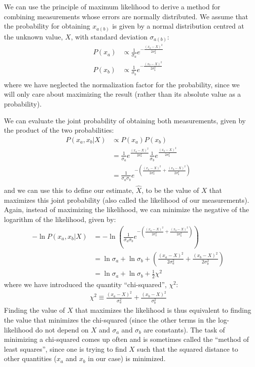 We can use the principle of maximum likelihood to derive a method for combining measurements whose errors are normally distributed. We assume that the probability for obtaining $x_{a(b)}$ is given by a normal distribution centred at the unknown value, $X$, with standard deviation $\sigma_{a(b)}$:
\begin{align}
P(x_a)&\propto \frac{1}{\sigma_a}e^{-\frac{(x_a-X)^2}{2\sigma_a^2}}\nonumber\\
P(x_b)&\propto \frac{1}{\sigma_b}e^{-\frac{(x_b-X)^2}{2\sigma_b^2}}\nonumber\\
\end{align} 
where we have neglected the normalization factor for the probability, since we will only care about maximizing the result (rather than its absolute value as a probability). 

We can evaluate the joint probability of obtaining both measurements, given by the product of the two probabilities:
\begin{align}
P(x_a,x_b|X)&\propto P(x_a) P(x_b) \nonumber\\
&=\frac{1}{\sigma_a}e^{\frac{(x_a-X)^2}{2\sigma_a^2}}\frac{1}{\sigma_b}e^{\frac{(x_b-X)^2}{2\sigma_b^2}}\nonumber\\
&=\frac{1}{\sigma_a\sigma_b}e^{-\left(\frac{(x_a-X)^2}{2\sigma_a^2}+\frac{(x_b-X)^2}{2\sigma_b^2}\right)}\nonumber\\
\end{align}
and we can use this to define our estimate, $\hat X$, to be the value of $X$ that maximizes this joint probability (also called the likelihood of our measurements). Again, instead of maximizing the likelihood, we can minimize the negative of the logarithm of the likelihood, given by:
\begin{align}
-\ln{P(x_a,x_b|X)}&=-\ln\left(\frac{1}{\sigma_a\sigma_b}e^{-\left(\frac{(x_a-X)^2}{2\sigma_a^2}+\frac{(x_b-X)^2}{2\sigma_b^2}\right)}\right)\nonumber\\
&=\ln{\sigma_a}+\ln{\sigma_b}+\left(\frac{(x_a-X)^2}{2\sigma_a^2}+\frac{(x_b-X)^2}{2\sigma_b^2}\right)\nonumber\\
&=\ln{\sigma_a}+\ln{\sigma_b}+\frac{1}{2}\chi^2
\end{align} 
where we have introduced the quantity ``chi-squared'', $\chi^2$:
\begin{align}
\chi^2\equiv \frac{(x_a-X)^2}{\sigma_a^2}+\frac{(x_b-X)^2}{\sigma_b^2}
\end{align}
Finding the value of $X$ that maximizes the likelihood is thus equivalent to finding the value that minimizes the chi-squared (since the other terms in the log-likelihood do not depend on $X$ and $\sigma_a$ and $\sigma_b$ are constants). The task of minimizing a chi-squared comes up often and is sometimes called the ``method of least squares'', since one is trying to find $X$ such that the squared distance to other quantities ($x_a$ and $x_b$ in our case) is minimized. 

